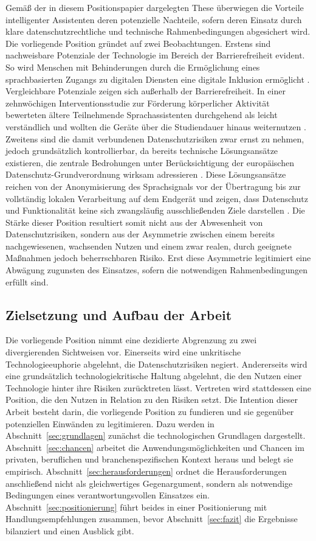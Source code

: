 Gemäß der in diesem Positionspapier dargelegten These überwiegen die Vorteile intelligenter Assistenten deren potenzielle Nachteile, sofern deren Einsatz durch klare datenschutzrechtliche und technische Rahmenbedingungen abgesichert wird. Die vorliegende Position gründet auf zwei Beobachtungen. Erstens sind nachweisbare Potenziale der Technologie im Bereich der Barrierefreiheit evident. So wird Menschen mit Behinderungen durch die Ermöglichung eines sprachbasierten Zugangs zu digitalen Diensten eine digitale Inklusion ermöglicht \cite{Esquivel2024}. Vergleichbare Potenziale zeigen sich außerhalb der Barrierefreiheit. In einer zehnwöchigen Interventionsstudie zur Förderung körperlicher Aktivität bewerteten ältere Teilnehmende Sprachassistenten durchgehend als leicht verständlich und wollten die Geräte über die Studiendauer hinaus weiternutzen \cite{Quinn2024}. Zweitens sind die damit verbundenen Datenschutzrisiken zwar ernst zu nehmen, jedoch grundsätzlich kontrollierbar, da bereits technische Lösungsansätze existieren, die zentrale Bedrohungen unter Berücksichtigung der europäischen Datenschutz-Grundverordnung wirksam adressieren \cite{HernandezAcosta2022}. Diese Lösungsansätze reichen von der Anonymisierung des Sprachsignals vor der Übertragung bis zur vollständig lokalen Verarbeitung auf dem Endgerät und zeigen, dass Datenschutz und Funktionalität keine sich zwangsläufig ausschließenden Ziele darstellen \cite{HernandezAcosta2022}. Die Stärke dieser Position resultiert somit nicht aus der Abwesenheit von Datenschutzrisiken, sondern aus der Asymmetrie zwischen einem bereits nachgewiesenen, wachsenden Nutzen und einem zwar realen, durch geeignete Maßnahmen jedoch beherrschbaren Risiko. Erst diese Asymmetrie legitimiert eine Abwägung zugunsten des Einsatzes, sofern die notwendigen Rahmenbedingungen erfüllt sind.

\subsection{Zielsetzung und Aufbau der Arbeit} 
Die vorliegende Position nimmt eine dezidierte Abgrenzung zu zwei divergierenden Sichtweisen vor. Einerseits wird eine unkritische Technologieeuphorie abgelehnt, die Datenschutzrisiken negiert. Andererseits wird eine grundsätzlich technologiekritische Haltung abgelehnt, die den Nutzen einer Technologie hinter ihre Risiken zurücktreten lässt. Vertreten wird stattdessen eine Position, die den Nutzen in Relation zu den Risiken setzt. Die Intention dieser Arbeit besteht darin, die vorliegende Position zu fundieren und sie gegenüber potenziellen Einwänden zu legitimieren. Dazu werden in Abschnitt~\ref{sec:grundlagen} zunächst die technologischen Grundlagen dargestellt. Abschnitt~\ref{sec:chancen} arbeitet die Anwendungsmöglichkeiten und Chancen im privaten, beruflichen und branchenspezifischen Kontext heraus und belegt sie empirisch. Abschnitt~\ref{sec:herausforderungen} ordnet die Herausforderungen anschließend nicht als gleichwertiges Gegenargument, sondern als notwendige Bedingungen eines verantwortungsvollen Einsatzes ein. Abschnitt~\ref{sec:positionierung} führt beides in einer Positionierung mit Handlungsempfehlungen zusammen, bevor Abschnitt~\ref{sec:fazit} die Ergebnisse bilanziert und einen Ausblick gibt.

